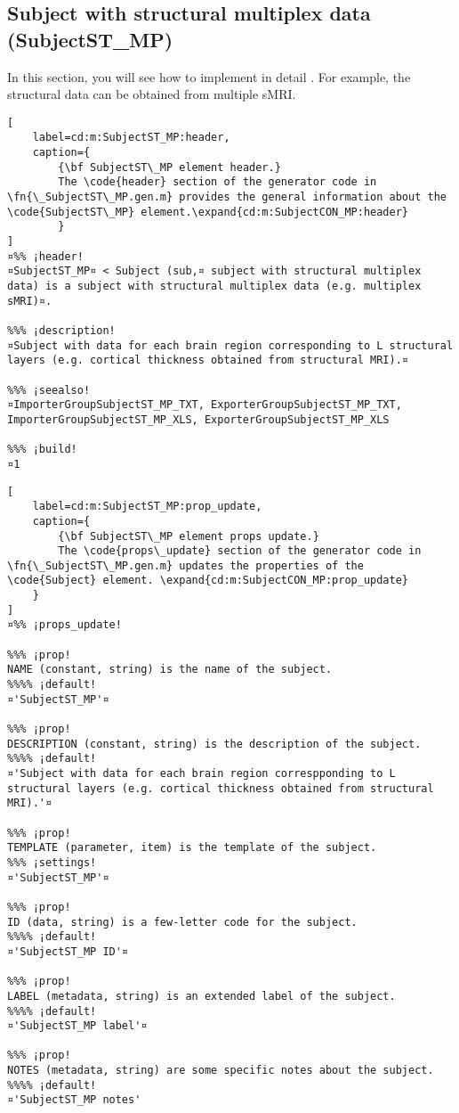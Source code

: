 \documentclass{tufte-handout}
\begin{document}
\clearpage

\subsection{Subject with structural multiplex data (SubjectST\_MP)}

In this section‚ you will see how to implement in detail . For example, the structural data can be obtained from multiple sMRI.

\begin{lstlisting}[
	label=cd:m:SubjectST_MP:header,
	caption={
		{\bf SubjectST\_MP element header.}
		The \code{header} section of the generator code in \fn{\_SubjectST\_MP.gen.m} provides the general information about the \code{SubjectST\_MP} element.\expand{cd:m:SubjectCON_MP:header}
		}
]
¤%% ¡header!
¤SubjectST_MP¤ < Subject (sub,¤ subject with structural multiplex data) is a subject with structural multiplex data (e.g. multiplex sMRI)¤.

%%% ¡description!
¤Subject with data for each brain region corresponding to L structural layers (e.g. cortical thickness obtained from structural MRI).¤

%%% ¡seealso!
¤ImporterGroupSubjectST_MP_TXT, ExporterGroupSubjectST_MP_TXT, ImporterGroupSubjectST_MP_XLS, ExporterGroupSubjectST_MP_XLS

%%% ¡build!
¤1
\end{lstlisting}

\begin{lstlisting}[
	label=cd:m:SubjectST_MP:prop_update,
	caption={
		{\bf SubjectST\_MP element props update.}
		The \code{props\_update} section of the generator code in \fn{\_SubjectST\_MP.gen.m} updates the properties of the \code{Subject} element. \expand{cd:m:SubjectCON_MP:prop_update}
	}
]
¤%% ¡props_update!

%%% ¡prop!
NAME (constant, string) is the name of the subject.
%%%% ¡default!
¤'SubjectST_MP'¤

%%% ¡prop!
DESCRIPTION (constant, string) is the description of the subject.
%%%% ¡default!
¤'Subject with data for each brain region correspponding to L structural layers (e.g. cortical thickness obtained from structural MRI).'¤

%%% ¡prop!
TEMPLATE (parameter, item) is the template of the subject.
%%% ¡settings!
¤'SubjectST_MP'¤

%%% ¡prop!
ID (data, string) is a few-letter code for the subject.
%%%% ¡default!
¤'SubjectST_MP ID'¤

%%% ¡prop!
LABEL (metadata, string) is an extended label of the subject.
%%%% ¡default!
¤'SubjectST_MP label'¤

%%% ¡prop!
NOTES (metadata, string) are some specific notes about the subject.
%%%% ¡default!
¤'SubjectST_MP notes'
\end{lstlisting}
\end{document}
